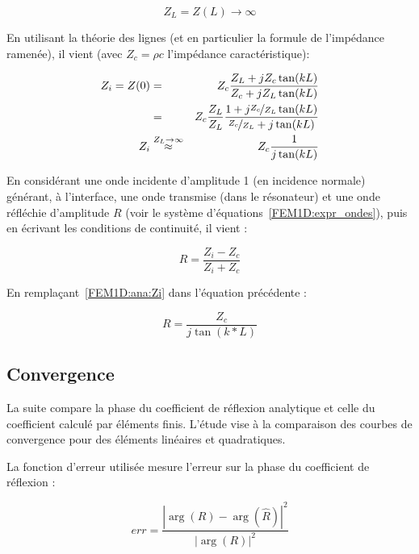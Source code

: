 \begin{equation}
	Z_L = Z(L) \rightarrow \infty \label{FEM1D:ana:ZL}
\end{equation}

En utilisant la théorie des lignes (et en particulier la formule de l'impédance ramenée), il vient (avec $Z_c =
\rho c$ l'impédance caractéristique):

\begin{eqnarray}
	Z_i = Z(0) 	& = & Z_c \frac{Z_L+jZ_c\tan(kL)}{Z_c + jZ_L\tan(kL)}\notag\\
			    & = & Z_c \frac{Z_L}{Z_L}\frac{1+j\nicefrac{Z_c}{Z_L}\tan(kL)}{\nicefrac{Z_c}{Z_L} + j\tan(kL)}\notag\\
		    Z_i & \overset{Z_L\rightarrow\infty}{\approx} & Z_c\frac{1}{j\tan(kL)}\label{FEM1D:ana:Zi}
\end{eqnarray}

En considérant une onde incidente d'amplitude 1 (en incidence normale) générant, à l'interface, une onde transmise (dans le
résonateur) et une onde réfléchie d'amplitude $R$ (voir le système d'équations~\eqref{FEM1D:expr_ondes}), puis en écrivant les
conditions de continuité, il vient :

\begin{equation*}
	R = \frac{Z_i-Z_c}{Z_i+Z_c}
\end{equation*}

En remplaçant~\eqref{FEM1D:ana:Zi} dans l'équation précédente :

\begin{equation}
	R = \frac{Z_c}{j\tan(k*L)}\label{FEM1D:ana:R}
\end{equation}

\subsection{Convergence}

La suite compare la phase du coefficient de réflexion analytique et celle du coefficient calculé par éléments
finis. L'étude vise à la comparaison des courbes de convergence pour des éléments linéaires et quadratiques.

La fonction d'erreur utilisée mesure l'erreur sur la phase du coefficient de réflexion :

\begin{equation}
	err = \frac{\left|\arg(R) - \arg(\hat{R})\right|^2}{\left|\arg(R)\right|^2}
    \label{FEM1D:errf}
\end{equation}


